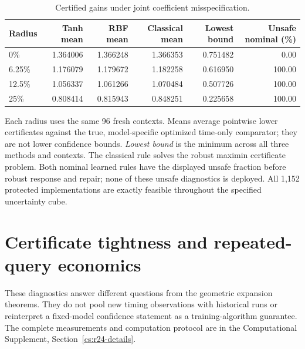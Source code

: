 \documentclass[11pt,letterpaper]{article}
\theoremstyle{definition}
\newcommand{\1}{\mathbf 1}
\begin{document}
\begin{table}[tbp]\centering\small
\caption{Certified gains under joint coefficient misspecification.}\label{tab:r23-robust}
\begin{tabular}{lrrrrr}\toprule
Radius & Tanh mean & RBF mean & Classical mean & Lowest bound & Unsafe nominal (\%)\\\midrule
0\% & 1.364006 & 1.366248 & 1.366353 & 0.751482 & 0.00\\
6.25\% & 1.176079 & 1.179672 & 1.182258 & 0.616950 & 100.00\\
12.5\% & 1.056337 & 1.061266 & 1.070484 & 0.507726 & 100.00\\
25\% & 0.808414 & 0.815943 & 0.848251 & 0.225658 & 100.00\\
\bottomrule\end{tabular}
\par\smallskip\begin{minipage}{.98\textwidth}\small Each radius uses the same 96 fresh contexts. Means average pointwise lower certificates against the true, model-specific optimized time-only comparator; they are not lower confidence bounds. \emph{Lowest bound} is the minimum across all three methods and contexts. The classical rule solves the robust maximin certificate problem. Both nominal learned rules have the displayed unsafe fraction before robust response and repair; none of these unsafe diagnostics is deployed. All 1,152 protected implementations are exactly feasible throughout the specified uncertainty cube.\end{minipage}
\end{table}

\section{Certificate tightness and repeated-query economics}\label{sec:r24-diagnostics}
These diagnostics answer different questions from the geometric expansion
theorems. They do not pool new timing observations with historical runs or
reinterpret a fixed-model confidence statement as a training-algorithm
guarantee. The complete measurements and computation protocol are in the
Computational Supplement, Section~\ref{cs:r24-details}.
\end{document}
